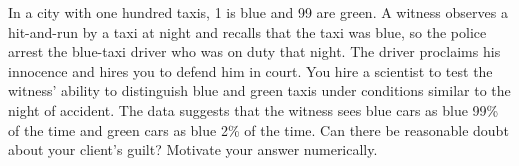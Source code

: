 \documentclass[a4paper,10pt,landscape,twocolumn]{scrartcl}
\begin{document}

\begin{exercise}[Taxi's]
  In a city with one hundred taxis, 1 is blue and 99 are green. A witness
  observes a hit-and-run by a taxi at night and recalls that the taxi was blue,
  so the police arrest the blue-taxi driver who was on duty that night. The
  driver proclaims his innocence and hires you to defend him in court. You hire
  a scientist to test the witness' ability to distinguish blue and green taxis
  under conditions similar to the night of accident. The data suggests that the
  witness sees blue cars as blue 99\% of the time and green cars as blue 2\% of
  the time. Can there be reasonable doubt about your client's guilt? Motivate
  your answer numerically.
\end{exercise}

\vfill\creditspracticequestions
\end{document}
